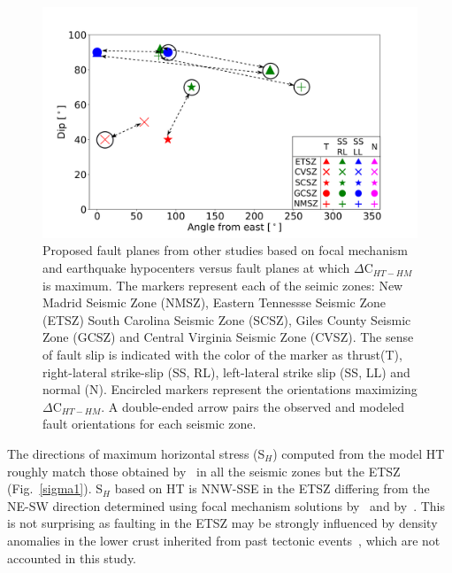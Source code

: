\documentclass[draft,linenumbers]{agujournal2018}
\begin{document}
\begin{figure}[ht]
    \centering
    \includegraphics[width=0.8\linewidth]{figures/summ_stress.png}
    \caption{Proposed fault planes from other studies based on focal mechanism and earthquake hypocenters versus fault planes at which $\Delta$C$_{HT-HM}$ is maximum. The markers represent each of the seimic zones: New Madrid Seismic Zone (NMSZ), Eastern Tennessse Seismic Zone (ETSZ) South Carolina Seismic Zone (SCSZ), Giles County Seismic Zone (GCSZ) and Central Virginia Seismic Zone (CVSZ). The sense of fault slip is indicated with the color of the marker as thrust(T), right-lateral strike-slip (SS, RL), left-lateral strike slip (SS, LL) and normal (N). Encircled markers represent the orientations maximizing $\Delta$C$_{HT-HM}$. A double-ended arrow pairs the observed and modeled fault orientations for each seismic zone.}
    \label{summary}
\end{figure}
 
%
%
The directions of maximum horizontal stress (S$_H$) computed from the model HT roughly match those obtained by~\citet{levandowski2018updated} in all the seismic zones but the ETSZ (Fig.~\ref{sigma1}).  S$_{H}$ based on HT is NNW-SSE in the ETSZ differing from the NE-SW direction determined using focal mechanism solutions by~\citet{levandowski2018updated} and by~\citet{mazzotti2010state}. This is not surprising as faulting in the ETSZ may be strongly influenced by density anomalies in the lower crust inherited from past tectonic events~\citep{levandowski2018updated}, which are not accounted in this study.
\end{document}
